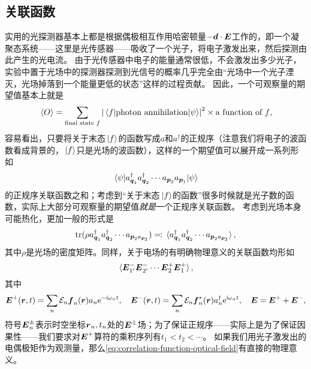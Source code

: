 \subsection{关联函数}\label{sec:correlation-function-photon}

实用的光探测器基本上都是根据偶极相互作用哈密顿量$- \vb*{d} \cdot \vb*{E}$工作的，即一个凝聚态系统——这里是光传感器——吸收了一个光子，将电子激发出来，然后探测由此产生的光电流。
由于光传感器中电子的能量通常很低，不会激发出多少光子，实验中置于光场中的探测器探测到光信号的概率几乎完全由“光场中一个光子湮灭，光场掉落到一个能量更低的状态”这样的过程贡献。
因此，一个可观察量的期望值基本上就是
\[
    \expval*{O} = \sum_\text{final state $f$} \abs{\mel{f}{\text{photon annihilation}}{\psi}}^2 \times \text{a function of $f$},
\]
容易看出，只要将关于末态$\ket*{f}$的函数写成$a$和$a^\dagger$的正规序（注意我们将电子的波函数看成背景的，$\ket*{f}$只是光场的波函数），这样的一个期望值可以展开成一系列形如
\[
    \mel{\psi}{a^\dagger_{\vb*{q}_1} a^\dagger_{\vb*{q}_2} \cdots a_{\vb*{p}_2} a_{\vb*{p}_1}}{\psi}
\]
的正规序关联函数之和；考虑到“关于末态$\ket*{f}$的函数”很多时候就是光子数的函数，实际上大部分可观察量的期望值\emph{就是}一个正规序关联函数。
考虑到光场本身可能热化，更加一般的形式是
\[
    \trace(\rho a^\dagger_{\vb*{q}_1} a^\dagger_{\vb*{q}_2} \cdots a_{\vb*{p}_2 a_{\vb*{p}_2}}) \eqqcolon \expval*{a^\dagger_{\vb*{q}_1} a^\dagger_{\vb*{q}_2} \cdots a_{\vb*{p}_2 a_{\vb*{p}_2}}},
\]
其中$\rho$是光场的密度矩阵。同样，关于电场的有明确物理意义的关联函数均形如
\begin{equation}
    \expval*{\vb*{E}^-_{1'} \vb*{E}^-_{2'} \cdots \vb*{E}^+_2 \vb*{E}^+_1},
    \label{eq:correlation-function-optical-field}
\end{equation}
其中
\begin{equation}
    \vb*{E}^{+} (\vb*{r}, t) = \sum_n \mathcal{E}_n \vb*{f}_n(\vb*{r}) a_n \mathrm{e}^{-\mathrm{i} \omega_n t} , \quad \vb*{E}^{-} (\vb*{r}, t) = \sum_n \mathcal{E}_n \vb*{f}^*_n(\vb*{r}) a^\dagger_n \mathrm{e}^{\mathrm{i} \omega_n t}, \quad \vb*{E} = \vb*{E}^+ + \vb*{E}^-,
\end{equation}
符号$\vb*{E}^{\pm}_n$表示时空坐标$\vb*{r}_n, t_n$处的$\vb*{E}^\pm$场；为了保证正规序——实际上是为了保证因果性——我们要求对$\vb*{E}^+$算符的乘积序列有$t_1 < t_2 < \cdots$。
如果我们用光子激发出的电偶极矩作为观测量，那么\eqref{eq:correlation-function-optical-field}有直接的物理意义。

